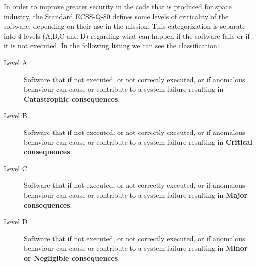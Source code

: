 In order to improve greater security in the code that is produced for space industry, the Standard ECSS-Q-80\cite{ecss-q-st-80c} defines
some levels of criticality of the software, depending on their use in the mission.
This categorization is separate into 4 levels (A,B,C and D) regarding what can happen if the software fails or if it is not executed.
In the following listing we can see the classification:

\begin{description}
\item[Level A] Software that if not executed, or not correctly executed, or if anomalous behaviour can cause or contribute to a system failure resulting in \textbf{Catastrophic consequences};
\item[Level B] Software that if not executed, or not correctly executed, or if anomalous behaviour can cause or contribute to a system failure resulting in \textbf{Critical consequences};
\item[Level C] Software that if not executed, or not correctly executed, or if anomalous behaviour can cause or contribute to a system failure resulting in \textbf{Major consequences};
\item[Level D] Software that if not executed, or not correctly executed, or if anomalous behaviour can cause or contribute to a system failure resulting in \textbf{Minor or Negligible consequences}.
\end{description}

